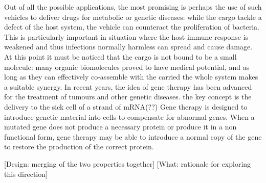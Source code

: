 Out of all the possible applications, the most promising is perhaps the use of such vehicles to deliver drugs for metabolic or genetic diseases: while the cargo tackle a defect of the host system, the vehicle can counteract the proliferation of bacteria. This is particularly important in situation where the host immune response is weakened and thus infections normally harmless can spread and cause damage.
%
At this point it must be noticed that the cargo is not bound to be a small molecule: many organic biomolecules proved to have medical potential, and as long as they can effectively co-assemble with the carried the whole system makes a suitable synergy.
%
In recent years, the idea of gene therapy has been advanced for the treatment of tumours and other genetic diseases. the key concept is the delivery to the sick cell of a strand of mRNA(??)
%
Gene therapy is designed to introduce genetic material into cells to compensate for abnormal genes. When a mutated gene does not produce a necessary protein or produce it in a non functional form, gene therapy may be able to introduce a normal copy of the gene to restore the production of the correct protein.
%
%

[Design: merging of the two properties together]
[What: rationale for exploring this direction]

